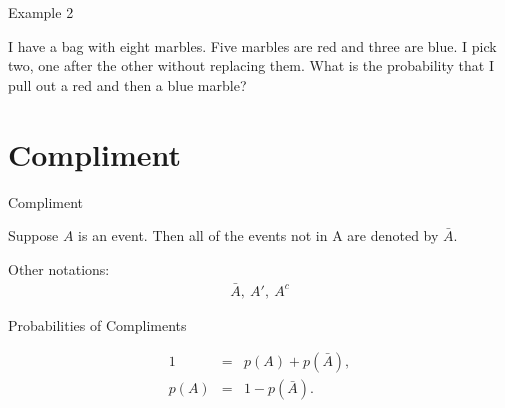 \begin{frame}{Example 2}

  I have a bag with eight marbles. Five marbles are red and three are
  blue. I pick two, one after the other without replacing them. What
  is the probability that I pull out a red and then a blue marble?
  
\end{frame}

\section{Compliment}

\begin{frame}{Compliment}

  \begin{definition}
    Suppose $A$ is an event. Then all of the events not in A are denoted
    by $\bar{A}$. 

    Other notations:
    \begin{eqnarray*}
      \bar{A},~A',~A^c
    \end{eqnarray*}
  \end{definition}


\end{frame}


\begin{frame}{Probabilities of Compliments}
  
  \begin{eqnarray*}
    1 & = & p(A) + p(\bar{A}), \\
    p(A) & = & 1 - p(\bar{A}).
  \end{eqnarray*}

\end{frame}


